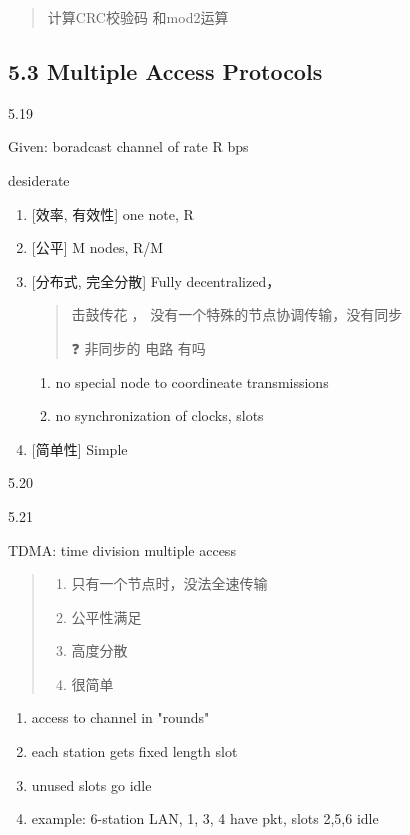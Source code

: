 \documentclass[
]{article}
\begin{document}
\begin{quote}
计算CRC校验码 和mod2运算
\end{quote}

\hypertarget{53-multiple-access-protocols}{%
\subsection{5.3 Multiple Access
Protocols}\label{53-multiple-access-protocols}}

5.19

Given: boradcast channel of rate R bps

desiderate

\begin{enumerate}
\def\labelenumi{\arabic{enumi}.}
\item
  {[}效率, 有效性{]} one note, R
\item
  {[}公平{]} M nodes, R/M
\item
  {[}分布式, 完全分散{]} Fully decentralized，

  \begin{quote}
  击鼓传花🥁， 没有一个特殊的节点协调传输，没有同步

  ❓ 非同步的 电路 有吗
  \end{quote}

  \begin{enumerate}
  \def\labelenumii{\arabic{enumii}.}
  \item
    no special node to coordineate transmissions
  \item
    no synchronization of clocks, slots
  \end{enumerate}
\item
  {[}简单性{]} Simple
\end{enumerate}

5.20

5.21

TDMA: time division multiple access

\begin{quote}
\begin{enumerate}
\def\labelenumi{\arabic{enumi}.}
\item
  只有一个节点时，没法全速传输
\item
  公平性满足
\item
  高度分散
\item
  很简单
\end{enumerate}
\end{quote}

\begin{enumerate}
\def\labelenumi{\arabic{enumi}.}
\item
  access to channel in "rounds"
\item
  each station gets fixed length slot
\item
  unused slots go idle
\item
  example: 6-station LAN, 1, 3, 4 have pkt, slots 2,5,6 idle
\end{enumerate}
\end{document}
